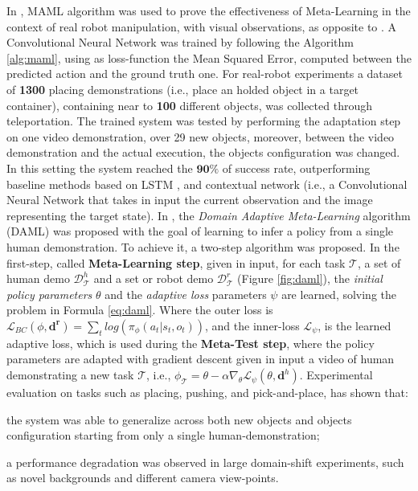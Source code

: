 \newline In \cite{finn2017one_shot_visual_il}, MAML algorithm was used to prove the effectiveness of Meta-Learning in the context of real robot manipulation, with visual observations, as opposite to \cite{duan2017one_shot_il}. A Convolutional Neural Network was trained by following the Algorithm \ref{alg:maml}, using as loss-function the Mean Squared Error, computed between the predicted action and the ground truth one. For real-robot experiments a dataset of \textbf{1300} placing demonstrations (i.e., place an holded object in a target container), containing near to \textbf{100} different objects, was collected through teleportation. The trained system was tested by performing the adaptation step on one video demonstration, over 29 new objects, moreover, between the video demonstration and the actual execution, the objects configuration was changed. In this setting the system reached the $\mathbf{90\%}$ of success rate, outperforming baseline methods based on LSTM \cite{duan2017one_shot_il}, and contextual network (i.e., a Convolutional Neural Network that takes in input the current observation and the image representing the target state). 
In \cite{yu2018daml}, the \textit{Domain Adaptive Meta-Learning} algorithm (DAML) was proposed with the goal of learning to infer a policy from a single human demonstration. To achieve it, a two-step algorithm was proposed. In the first-step, called \textbf{Meta-Learning step}, given in input, for each task $\mathcal{T}$, a set of human demo $\mathcal{D}^{h}_{\mathcal{T}}$ and a set or robot demo $\mathcal{D}^{r}_{\mathcal{T}}$ (Figure \ref{fig:daml}), the \textit{initial policy parameters} $\theta$ and the \textit{adaptive loss} parameters $\psi$ are learned, solving the problem in Formula \ref{eq:daml}. 
\newline Where the outer loss is $\mathcal{L}_{BC}(\phi,\mathbf{d^{r}}) = \sum_{t} log(\pi_{\phi}(a_{t}|s_{t},o_{t}))$, and the inner-loss $\mathcal{L}_{\psi}$, is the learned adaptive loss, which is used during the \textbf{Meta-Test step}, where the policy parameters are adapted with gradient descent given in input a video of human demonstrating a new task $\mathcal{T}$, i.e., $\phi_{\mathcal{T}} = \theta - \alpha \nabla_{\theta} \mathcal{L}_{\psi}(\theta, \mathbf{d}^{h})$. Experimental evaluation on tasks such as placing, pushing, and pick-and-place, has shown that: \begin{enumerate*}[label=\textbf{(\alph*)}]
    \item the system was able to generalize across both new objects and objects configuration starting from only a single human-demonstration;
    \item a performance degradation was observed in large domain-shift experiments, such as novel backgrounds and different camera view-points.
\end{enumerate*}

